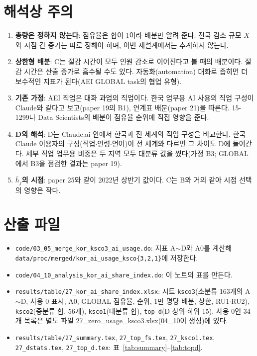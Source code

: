 \documentclass[11pt]{article}
\begin{document}
\section{해석상 주의}

\begin{enumerate}[leftmargin=*]
  \item \textbf{총량은 정하지 않는다}: 점유율은 합이 1이라 배분만 알려 준다. 전국 감소 규모 $X$와 시점 간 증가는 따로 정해야 하며, 이번 재설계에서는 추계하지 않는다.
  \item \textbf{상한형 배분}: C는 절감 시간이 모두 인원 감소로 이어진다고 볼 때의 배분이다. 절감 시간은 산출 증가로 흡수될 수도 있다. 자동화(automation) 대화로 좁히면 더 보수적인 지표가 된다(AEI GLOBAL task의 협업 유형).
  \item \textbf{기존 가정}: AEI 직업은 대화 과업의 직업이다. 한국 업무용 AI 사용의 직업 구성이 Claude와 같다고 보고(paper 19의 B1), 연계표 배분(paper 21)을 따른다. 15-1299나 Data Scientists의 배분이 점유율 순위에 직접 영향을 준다.
  \item \textbf{D의 해석}: D는 Claude.ai 안에서 한국과 전 세계의 직업 구성을 비교한다. 한국 Claude 이용자의 구성(직업$\cdot$연령$\cdot$언어)이 전 세계와 다르면 그 차이도 D에 들어간다. 세부 직업 업무용 비중은 두 지역 모두 대분류 값을 썼다(가정 B3; GLOBAL에서 B3을 점검한 결과는 paper 19).
  \item \textbf{$\bar h_j$의 시점}: paper 25와 같이 2022년 상반기 값이다. C는 B와 거의 같아 시점 선택의 영향은 작다.
\end{enumerate}

\section{산출 파일}

\begin{itemize}[leftmargin=*]
  \item \texttt{code/03\_05\_merge\_kor\_ksco3\_ai\_usage.do}: 지표 A$\sim$D와 A0를 계산해 \texttt{data/proc/merged/kor\_ai\_usage\_ksco\{3,2,1\}}에 저장한다.
  \item \texttt{code/04\_10\_analysis\_kor\_ai\_share\_index.do}: 이 노트의 표를 만든다.
  \item \texttt{results/table/27\_kor\_ai\_share\_index.xlsx}: 시트 \texttt{ksco3}(소분류 163개의 A$\sim$D, 사용 0 표시, A0, GLOBAL 점유율, 순위, 1만 명당 배분, 상한, RU1$\cdot$RU2), \texttt{ksco2}(중분류 합, 56개), \texttt{ksco1}(대분류 합), \texttt{top\_d}(D 상위$\cdot$하위 15). 사용 0인 34개 목록은 별도 파일 27\_zero\_usage\_ksco3.xlsx(04\_10이 생성)에 있다.
  \item \texttt{results/table/27\_summary.tex}, \texttt{27\_top\_fs.tex}, \texttt{27\_ksco1.tex}, \texttt{27\_dstats.tex}, \texttt{27\_top\_d.tex}: 표~\ref{tab:summary}--\ref{tab:topd}.
\end{itemize}
\end{document}
